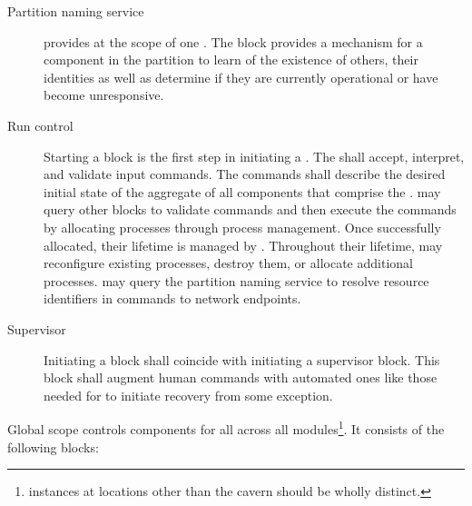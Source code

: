 \begin{description}
\item[Partition naming service]  provides  at the scope  of one . 
  The block provides a mechanism for a component in the partition to learn of the existence of others,  their identities as well as determine if they are currently operational or have become unresponsive.

\item[Run control] Starting a  block is the first step in initiating a . 
  The  shall accept, interpret, and validate  input commands.  The commands shall describe the desired initial state of the aggregate of all components that comprise the .   may query other blocks to validate commands and then execute the commands by allocating processes through process management.  Once successfully allocated, their lifetime is managed by .  Throughout their lifetime,  may reconfigure existing processes, destroy them, or allocate additional processes.   may query the partition naming service to resolve resource identifiers in commands to network endpoints.  

\item[Supervisor] Initiating a  block shall coincide with initiating a supervisor block.  This block shall augment human commands with automated ones like those needed for  to initiate recovery from some exception.

\end{description}

Global scope controls  components for all  across all  modules\footnote{ instances at locations other than the  cavern should be wholly distinct.}.  It consists of the following blocks:


